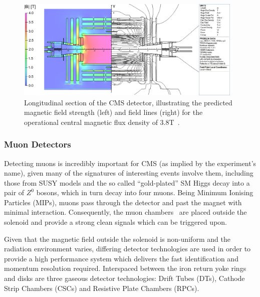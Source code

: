 \begin{figure}[htbp]
\begin{center}
\includegraphics[width=0.97\textwidth]{figs/cms/cms_magnetic_field.png}
\caption{Longitudinal section of the CMS detector, illustrating the predicted magnetic field strength (left) and field lines (right) for the operational central magnetic flux density of 3.8T~\cite{Chatrchyan:2009si}.}
\label{fig:magneticField}
\end{center}
\end{figure}

\subsubsection{Muon Detectors}\label{subsubsec:muon chambers}
Detecting muons is incredibly important for CMS (as implied by the experiment’s name), given many of the signatures of interesting events involve them, including those from SUSY models and the so called “gold-plated” SM Higgs decay into a pair of $Z^{0}$ bosons, which in turn decay into four muons. 
Being Minimum Ionising Particles (MIPs), muons pass through the detector and past the magnet with minimal interaction.
Consequently, the muon chambers~\cite{CMS:1997iti} are placed outside the solenoid and provide a strong clean signals which can be triggered upon.

Given that the magnetic field outside the solenoid is non-uniform and the radiation environment varies, differing detector technologies are used in order to provide a high performance system which delivers the fast identification and momentum resolution required. 
Interspaced between the iron return yoke rings and disks are three gaseous detector technologies: Drift Tubes (DTs), Cathode Strip Chambers (CSCs) and Resistive Plate Chambers (RPCs).

